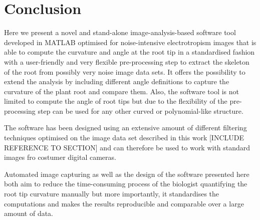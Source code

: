 
\chapter{Conclusion} %

\label{conclusion} %

%






Here we present a novel and stand-alone image-analysis-based software tool developed in MATLAB optimised for noise-intensive electrotropism images that is able to compute the curvature and angle at the root tip in a standardised fashion with a user-friendly and very flexible pre-processing step to extract the skeleton of the root from possibly very noise image data sets. 
It offers the possibility to extend the analysis by including different angle definitions to capture the curvature of the plant root and compare them. Also, the software tool is not limited to compute the angle of root tips but due to the flexibility of the pre-processing step can be used for any other curved or polynomial-like structure. 

The software has been designed using an extensive amount of different filtering techniques optimised on the image data set described in this work [INCLUDE REFERENCE TO SECTION] and can therefore be used to work with standard images fro costumer digital cameras. 

Automated image capturing as well as the design of the software presented here both aim to reduce the time-consuming process of the biologist quantifying the root tip curvature manually but more importantly, it standardises the computations and makes the results reproducible and comparable over a large amount of data. 

